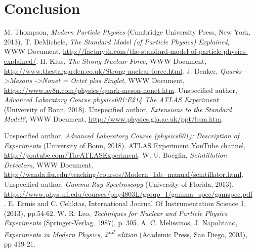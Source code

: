 \documentclass[twocolumn]{article}
\begin{document}
\section{Conclusion}
\begin{thebibliography}{9}
M. Thompson, \textsl{Modern Particle Physics} (Cambridge University Press, New York, 2013).
T. DeMichele, \textit{The Standard Model (of Particle Physics) Explained}, WWW Document, \url{http://factmyth.com/the-standard-model-of-particle-physics-explained/}.
H. Klus, \textit{The Strong Nuclear Force}, WWW Document, \url{http://www.thestargarden.co.uk/Strong-nuclear-force.html}.
J. Denker, \textit{Quarks -\textgreater Mesons -\textgreater Nonet = Octet plus Singlet}, WWW Document, \url{https://www.av8n.com/physics/quark-meson-nonet.htm}.
Unspecified author, \textsl{Advanced Laboratory Course physics601:E214 The ATLAS Experiment} (University of Bonn, 2018).
Unspecified author, \textsl{Extensions to the Standard Model?}, WWW Document, \url{http://www.physics.gla.ac.uk/ppt/bsm.htm}.

Unspecified author, \textsl{Advanced Laboratory Course (physics601): Description of Experiments} (University of Bonn, 2018).
ATLAS Experiment YouTube channel, \url{http://youtube.com/TheATLASExperiment}.
 W. U. Boeglin, \textit{Scintillation Detectors}, WWW Document, \url{http://wanda.fiu.edu/teaching/courses/Modern_lab_manual/scintillator.html}.
Unspecified author, \textsl{Gamma Ray Spectroscopy} (University of Florida, 2013), \url{https://www.phys.ufl.edu/courses/phy4803L/group_I/gamma_spec/gamspec.pdf}.
E. Ermis and C. Celiktas, International Journal Of Instrumentation Science 1, (2013), pp.54-62.
W. R. Leo, \textsl{Techniques for Nuclear and Particle Physics Experiments} (Springer-Verlag, 1987), p. 305.
A. C. Melissinos, J. Napolitano, \textsl{Experiments in Modern Physics, 2\textsuperscript{nd} edition} (Academic Press, San Diego, 2003), pp 419-21.
\end{thebibliography}
\newpage
\onecolumn
\end{document}
